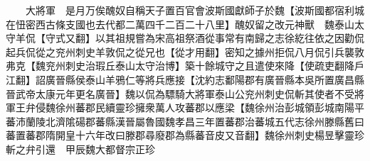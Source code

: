 　　大將軍　是月万俟醜奴自稱天子置百官會波斯國獻師子於魏【波斯國都宿利城在忸密西古條支國也去代都二萬四千二百二十八里】醜奴留之改元神獸　魏泰山太守羊侃【守式又翻】以其祖規嘗為宋高祖祭酒從事常有南歸之志徐紇往依之因勸侃起兵侃從之兖州刺史羊敦侃之從兄也【從才用翻】密知之據州拒侃八月侃引兵襲敦弗克【魏兖州刺史治瑕丘泰山太守治博】築十餘城守之且遣使來降【使疏吏翻降戶江翻】詔廣晉縣侯泰山羊鴉仁等將兵應接【沈約志鄱陽郡有廣晉縣本吳所置廣昌縣晉武帝太康元年更名廣晉】魏以侃為驃騎大將軍泰山公兖州刺史侃斬其使者不受將軍王弁侵魏徐州蕃郡民續靈珍擁衆萬人攻蕃郡以應梁【魏徐州治彭城領彭城南陽平蕃沛蘭陵北濟隂碭郡蕃縣漢晉屬魯國魏孝昌三年置蕃郡治蕃城五代志徐州滕縣舊曰蕃置蕃郡隋開皇十六年改曰滕郡尋廢郡為縣蕃音皮又音翻】魏徐州刺史楊昱擊靈珍斬之弁引還　甲辰魏大都督宗正珍